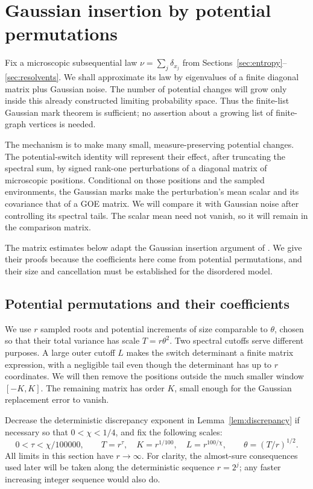 \section{Gaussian insertion by potential permutations}
\label{sec:insertion}

Fix a microscopic subsequential law \(\nu=\sum_j\delta_{x_j}\)
from Sections~\ref{sec:entropy}--\ref{sec:resolvents}. We shall approximate
its law by eigenvalues of a finite diagonal matrix plus Gaussian noise.
The number of potential changes will grow only inside this already
constructed limiting probability space. Thus the finite-list Gaussian
mark theorem is sufficient; no assertion about a growing list of finite-graph
vertices is needed.

The mechanism is to make many small, measure-preserving potential
changes. The potential-switch identity will represent their effect,
after truncating the spectral sum, by signed rank-one perturbations of
a diagonal matrix of microscopic positions. Conditional on those positions
and the sampled environments, the Gaussian marks make the perturbation's
mean scalar and its covariance that of a GOE matrix. We will compare it
with Gaussian noise after controlling its spectral tails. The scalar
mean need not vanish, so it will remain in the comparison matrix.

The matrix estimates below adapt the Gaussian insertion argument of
\cite[Sections~5.3--5.5]{bu}. We give their proofs because the coefficients
here come from potential permutations, and their size and cancellation
must be established for the disordered model.

\subsection{Potential permutations and their coefficients}

We use \(r\) sampled roots and potential increments of size comparable
to \(\theta\), chosen so that their total variance has scale
\(T=r\theta^2\). Two spectral cutoffs serve different purposes.
A large outer cutoff \(L\) makes the switch determinant a finite matrix
expression, with a negligible tail even though the determinant has up to
\(r\) coordinates. We will then remove the positions outside the much
smaller window \([-K,K]\). The remaining matrix has order \(K\), small
enough for the Gaussian replacement error to vanish.

Decrease the deterministic discrepancy exponent in Lemma~\ref{lem:discrepancy}
if necessary so that \(0<\chi<1/4\), and fix the following scales:
\begin{equation}\label{eq:sw-parameters}
 0<\tau<\chi/100000,\qquad
 T=r^\tau,\quad K=r^{1/100},\quad L=r^{100/\chi},\qquad
 \theta=(T/r)^{1/2}.
\end{equation}
All limits in this section have \(r\to\infty\). For clarity, the
almost-sure consequences used later will be taken along the deterministic
sequence \(r=2^j\); any faster increasing integer sequence would also do.

